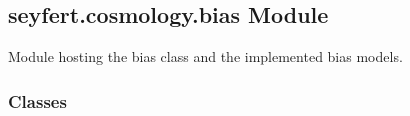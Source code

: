 \documentclass[letterpaper,10pt,english]{sphinxmanual}
\begin{document}
\subsection{seyfert.cosmology.bias Module}
\label{\detokenize{bias:module-seyfert.cosmology.bias}}\label{\detokenize{bias:seyfert-cosmology-bias-module}}
\sphinxAtStartPar
Module hosting the bias class and the implemented bias models.


\subsubsection{Classes}
\label{\detokenize{bias:classes}}
\end{document}

